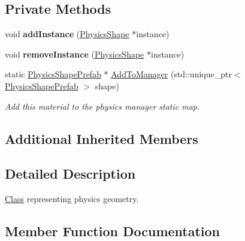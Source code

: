 \subsection*{Private Methods}
\begin{DoxyCompactItemize}
\item 
\mbox{\label{classrev_1_1_physics_shape_prefab_aaf6283d17b08b35538d2982facecf868}} 
void {\bfseries add\+Instance} (\mbox{\hyperlink{classrev_1_1_physics_shape}{Physics\+Shape}} $\ast$instance)
\item 
\mbox{\label{classrev_1_1_physics_shape_prefab_a8c901cb6098d3dbc90c9481566f59f91}} 
void {\bfseries remove\+Instance} (\mbox{\hyperlink{classrev_1_1_physics_shape}{Physics\+Shape}} $\ast$instance)
\item 
\mbox{\label{classrev_1_1_physics_shape_prefab_abfd9431e496d6c378ce1bb720c587ec8}} 
static \mbox{\hyperlink{classrev_1_1_physics_shape_prefab}{Physics\+Shape\+Prefab}} $\ast$ \mbox{\hyperlink{classrev_1_1_physics_shape_prefab_abfd9431e496d6c378ce1bb720c587ec8}{Add\+To\+Manager}} (std\+::unique\+\_\+ptr$<$ \mbox{\hyperlink{classrev_1_1_physics_shape_prefab}{Physics\+Shape\+Prefab}} $>$ shape)
\begin{DoxyCompactList}\small\item\em Add this material to the physics manager static map. \end{DoxyCompactList}\end{DoxyCompactItemize}
\subsection*{Additional Inherited Members}


\subsection{Detailed Description}
\mbox{\hyperlink{struct_class}{Class}} representing physics geometry. 

\subsection{Member Function Documentation}
\mbox{\label{classrev_1_1_physics_shape_prefab_a674652fd1f620a4b987f86e2fc2d8f74}} 

